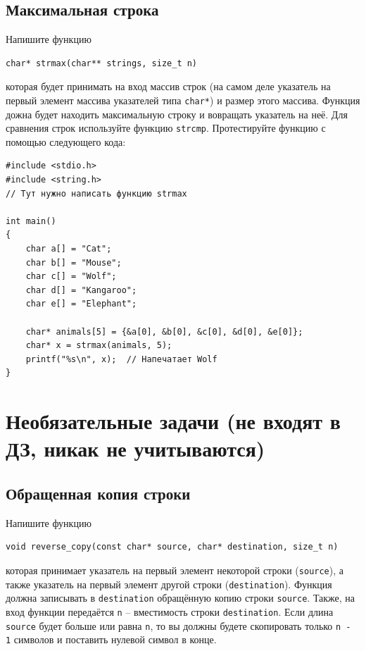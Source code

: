 \documentclass{article}
\begin{document}
 
\subsection{Максимальная строка}
Напишите функцию
\begin{lstlisting}
char* strmax(char** strings, size_t n)
\end{lstlisting}
которая будет принимать на вход массив строк (на самом деле указатель на первый элемент массива указателей типа \texttt{char*}) и размер этого массива.
Функция дожна будет находить максимальную строку и вовращать указатель на неё.
Для сравнения строк используйте функцию \texttt{strcmp}.
Протестируйте функцию с помощью следующего кода:
\begin{lstlisting}
#include <stdio.h>
#include <string.h>
// Тут нужно написать функцию strmax

int main() 
{
    char a[] = "Cat";
    char b[] = "Mouse";
    char c[] = "Wolf";
    char d[] = "Kangaroo";
    char e[] = "Elephant";
    
    char* animals[5] = {&a[0], &b[0], &c[0], &d[0], &e[0]};
    char* x = strmax(animals, 5);
    printf("%s\n", x);  // Напечатает Wolf
}
\end{lstlisting} 






\newpage
\section*{Необязательные задачи (не входят в ДЗ, никак не учитываются)}
\setcounter{subsection}{0}



\subsection{Обращенная копия строки}
Напишите функцию 
\begin{lstlisting}
void reverse_copy(const char* source, char* destination, size_t n)
\end{lstlisting}
которая принимает указатель на первый элемент некоторой строки (\texttt{source}), а также указатель на первый элемент другой строки (\texttt{destination}). Функция должна записывать в \texttt{destination} обращённую копию строки \texttt{source}. Также, на вход функции передаётся \texttt{n} -- вместимость строки \texttt{destination}. Если длина \texttt{source} будет больше или равна \texttt{n}, то вы должны будете скопировать только \texttt{n - 1} символов и поставить нулевой символ в конце.
\end{document}
